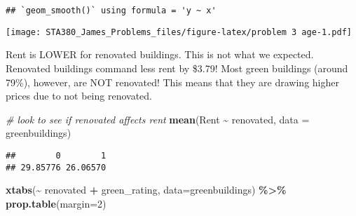 \documentclass[
]{article}
\newenvironment{Shaded}{\begin{snugshade}}{\end{snugshade}}
\newcommand{\AttributeTok}[1]{\textcolor[rgb]{0.13,0.29,0.53}{#1}}
\newcommand{\CommentTok}[1]{\textcolor[rgb]{0.56,0.35,0.01}{\textit{#1}}}
\newcommand{\ConstantTok}[1]{\textcolor[rgb]{0.56,0.35,0.01}{#1}}
\newcommand{\DecValTok}[1]{\textcolor[rgb]{0.00,0.00,0.81}{#1}}
\newcommand{\FloatTok}[1]{\textcolor[rgb]{0.00,0.00,0.81}{#1}}
\newcommand{\FunctionTok}[1]{\textcolor[rgb]{0.13,0.29,0.53}{\textbf{#1}}}
\newcommand{\NormalTok}[1]{#1}
\newcommand{\SpecialCharTok}[1]{\textcolor[rgb]{0.81,0.36,0.00}{\textbf{#1}}}
\newcommand{\StringTok}[1]{\textcolor[rgb]{0.31,0.60,0.02}{#1}}
\begin{document}
\begin{Shaded}
\end{Shaded}

\begin{verbatim}
## `geom_smooth()` using formula = 'y ~ x'
\end{verbatim}

\texttt{[image: STA380\_James\_Problems\_files/figure-latex/problem 3 age-1.pdf]}

Rent is LOWER for renovated buildings. This is not what we expected.
Renovated buildings command less rent by \$3.79! Most green buildings
(around 79\%), however, are NOT renovated! This means that they are
drawing higher prices due to not being renovated.

\begin{Shaded}
\begin{Highlighting}[]
\CommentTok{\# look to see if renovated affects rent}
\FunctionTok{mean}\NormalTok{(Rent }\SpecialCharTok{\textasciitilde{}}\NormalTok{ renovated, }\AttributeTok{data =}\NormalTok{ greenbuildings)}
\end{Highlighting}
\end{Shaded}

\begin{verbatim}
##        0        1 
## 29.85776 26.06570
\end{verbatim}

\begin{Shaded}
\begin{Highlighting}[]
\FunctionTok{xtabs}\NormalTok{(}\SpecialCharTok{\textasciitilde{}}\NormalTok{ renovated }\SpecialCharTok{+}\NormalTok{ green\_rating, }\AttributeTok{data=}\NormalTok{greenbuildings) }\SpecialCharTok{\%\textgreater{}\%}
  \FunctionTok{prop.table}\NormalTok{(}\AttributeTok{margin=}\DecValTok{2}\NormalTok{)}
\end{Highlighting}
\end{Shaded}
\end{document}
